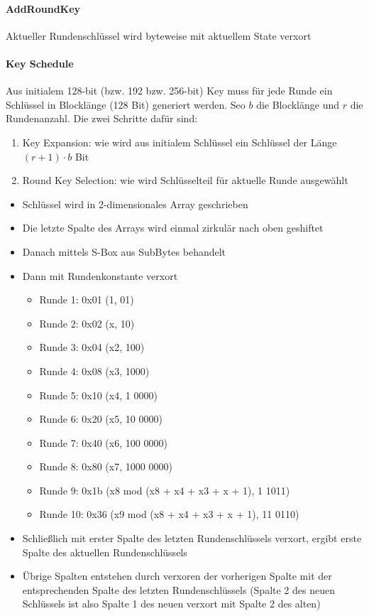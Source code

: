 \paragraph{AddRoundKey}

Aktueller Rundenschlüssel wird byteweise mit aktuellem State verxort

\paragraph{Key Schedule}

Aus initialem 128-bit (bzw. 192 bzw. 256-bit) Key muss für jede
Runde ein Schlüssel in Blocklänge (128 Bit) generiert werden. Seo $b$ die Blocklänge und $r$ die Rundenanzahl.
Die zwei Schritte dafür sind:

\begin{enumerate}
    \item Key Expansion: wie wird aus initialem Schlüssel ein Schlüssel der Länge $(r + 1) \cdot b$ Bit
    \item Round Key Selection: wie wird Schlüsselteil für aktuelle Runde ausgewählt
\end{enumerate}


\begin{itemize}
    \item Schlüssel wird in 2-dimensionales Array geschrieben
    \item Die letzte Spalte des Arrays wird einmal zirkulär nach oben geshiftet
    \item Danach mittels S-Box aus SubBytes behandelt
    \item Dann mit Rundenkonstante verxort
    \begin{itemize}
        \item Runde 1: 0x01 (1, 01)
        \item Runde 2: 0x02 (x, 10)
        \item Runde 3: 0x04 (x2, 100)
        \item Runde 4: 0x08 (x3, 1000)
        \item Runde 5: 0x10 (x4, 1 0000)
        \item Runde 6: 0x20 (x5, 10 0000)
        \item Runde 7: 0x40 (x6, 100 0000)
        \item Runde 8: 0x80 (x7, 1000 0000)
        \item Runde 9: 0x1b (x8 mod (x8 + x4 + x3 + x + 1), 1 1011)
        \item Runde 10: 0x36 (x9 mod (x8 + x4 + x3 + x + 1), 11 0110)
    \end{itemize}
    \item Schließlich mit erster Spalte des letzten Rundenschlüssels verxort, ergibt erste Spalte des aktuellen Rundenschlüssels
    \item Übrige Spalten entstehen durch verxoren der vorherigen Spalte mit der entsprechenden Spalte des letzten Rundenschlüssels
(Spalte 2 des neuen Schlüssels ist also Spalte 1 des neuen verxort mit Spalte 2 des alten) 
\end{itemize}

